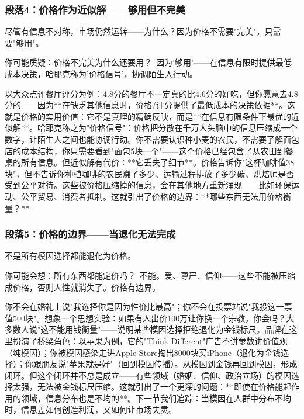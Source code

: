 \documentclass[openany, a4paper, 12pt]{book}
\begin{document}
	\subsubsection*{段落4：价格作为近似解——够用但不完美}
	尽管有信息不对称，市场仍然运转——为什么？因为价格不需要"完美"，只需要"够用"。
	\begin{tcolorbox}[colback=yellow!5, title=\textit{读者行为预测}]
		你可能质疑：价格不完美为什么还要用？\ 因为'够用'——在信息有限时提供最低成本决策，哈耶克称为'价格信号'，协调陌生人行动。
	\end{tcolorbox}

以大众点评餐厅评分为例：4.8分的餐厅不一定真的比4.6分的好吃，但你愿意去4.8分的——因为**在缺乏其他信息时，价格/评分提供了最低成本的决策依据**。这就是价格的实用价值：它不是真理的精确反映，而是**在信息有限条件下最优的近似解**。哈耶克称之为"价格信号"：价格把分散在千万人头脑中的信息压缩成一个数字，让陌生人之间也能协调行动。你不需要认识种小麦的农民，不需要了解面包店的成本结构，你只需要看到"面包5块一个"——这个价格已经包含了从农田到餐桌的所有信息。但近似解有代价：**它丢失了细节**。价格告诉你"这杯咖啡值38块"，但不告诉你种植咖啡的农民赚了多少、运输过程排放了多少碳、烘焙师是否受到公平对待。这些被价格压缩掉的信息，会在其他地方重新涌现——比如环保运动、公平贸易、消费者抵制。这就引出了价格的边界：**哪些东西无法用价格衡量？**

	\subsubsection*{段落5：价格的边界——当退化无法完成}
	不是所有模因选择都能退化为价格。
	\begin{tcolorbox}[colback=yellow!5, title=\textit{读者行为预测}]
		你可能会想：所有东西都能定价吗？\ 不能。爱、尊严、信仰——这些不能被压缩成价格，否则人性就消失了。价格有边界。
	\end{tcolorbox}

你不会在婚礼上说"我选择你是因为性价比最高"；你不会在投票站说"我投这一票值500块"。想象一个思想实验：如果有人出价100万让你换一个宗教，你会吗？大多数人说"这不能用钱衡量"——说明某些模因选择拒绝退化为金钱标尺。品牌在这里扮演了桥梁角色：以苹果为例，它的"Think Different"广告不讲参数讲价值观（纯模因）；你被模因感染走进Apple Store掏出8000块买iPhone（退化为金钱选择）；你跟朋友说"苹果就是好"（回到模因传播）。从模因到金钱再回到模因，形成闭环。但这个闭环并不总是成立——有些领域（婚姻、信仰、政治立场）的模因选择太强，无法被金钱标尺压缩。这就引出了一个更深的问题：**即使在价格能起作用的领域，信息分布也是不均的**。下一节我们追踪：当模因在人群中分布不均时，信息差如何创造利润，又如何让市场失灵。
\end{document}
